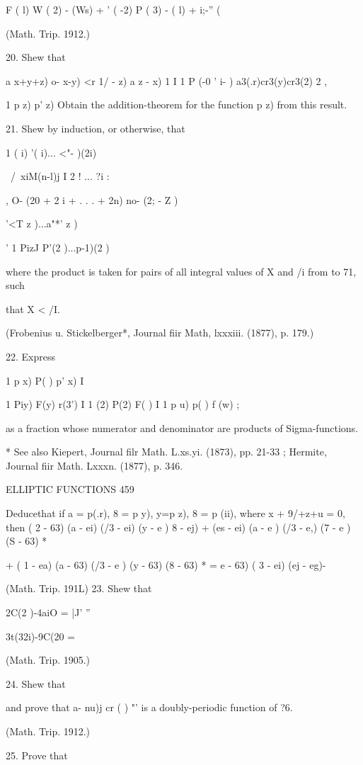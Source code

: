 {F ( l) W ( 2) - (Ws) + ' ( -2) P ( 3) - ( l) + i;-'' (%

(Math. Trip. 1912.)

20. Shew that

a x+y+z) o- x-y) <r 1/ - z) a z - x) 1 I 1 P (-0 ' i- )
a3(.r)cr3(y)cr3(2) 2 ,

1 p z) p' z) Obtain the addition-theorem for the function p z) from
this result.

21. Shew by induction, or otherwise, that

1 ( i) '( i)... <"- )(2i)

\ /\ xiM(n-l)j I 2 ! ... ?i :

, O- (20 + 2 i + . . . + 2n) no- (2; - Z )

'<T z )...a"*' z )

' 1 PizJ P'(2 )...p-1)(2 )

where the product is taken for pairs of all integral values of X and
/i from to 71, such

that X < /I.

(Frobenius u. Stickelberger*, Journal fiir Math, lxxxiii. (1877), p.
179.)

22. Express

1 p x) P( ) p' x) I

1 Piy) F(y) r(3') I 1 (2) P(2) F( ) I 1 p u) p( ) f (w) ;

as a fraction whose numerator and denominator are products of
Sigma-functions.

* See also Kiepert, Journal filr Math. L.xs.yi. (1873), pp. 21-33 ;
Hermite, Journal fiir Math. Lxxxn. (1877), p. 346.

ELLIPTIC FUNCTIONS 459

Deducethat if a = p(.r), 8 = p y), y=p z), 8 = p (ii), where x +
9/+z+u = 0, then ( 2 - 63) (a - ei) (/3 - ei) (y - e ) 8 - ej) + (es -
ei) (a - e ) (/3 - e,) (7 - e ) (S - 63) *

+ ( 1 - ea) (a - 63) (/3 - e ) (y - 63) (8 - 63) * = e - 63) ( 3 - ei)
(ej - eg)-

(Math. Trip. 191L) 23. Shew that

2C(2 )-4aiO = |J' ''

3t(32i)-9C(20 =

(Math. Trip. 1905.)

24. Shew that

and prove that a- nu)j cr ( ) "' is a doubly-periodic function of ?6.

(Math. Trip. 1912.)

25. Prove that

}
